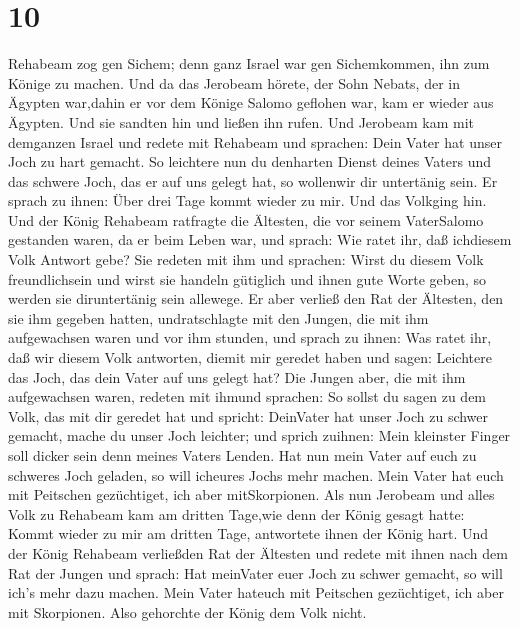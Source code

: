 \hypertarget{section-9}{%
\section{10}\label{section-9}}

 Rehabeam zog gen Sichem; denn ganz Israel war gen
Sichemkommen, ihn zum Könige zu machen.  Und da das Jerobeam
hörete, der Sohn Nebats, der in Ägypten war,dahin er vor dem Könige
Salomo geflohen war, kam er wieder aus Ägypten.  Und sie
sandten hin und ließen ihn rufen. Und Jerobeam kam mit demganzen Israel
und redete mit Rehabeam und sprachen:  Dein Vater hat unser
Joch zu hart gemacht. So leichtere nun du denharten Dienst deines Vaters
und das schwere Joch, das er auf uns gelegt hat, so wollenwir dir
untertänig sein.  Er sprach zu ihnen: Über drei Tage kommt
wieder zu mir. Und das Volkging hin.  Und der König Rehabeam
ratfragte die Ältesten, die vor seinem VaterSalomo gestanden waren, da
er beim Leben war, und sprach: Wie ratet ihr, daß ichdiesem Volk Antwort
gebe?  Sie redeten mit ihm und sprachen: Wirst du diesem
Volk freundlichsein und wirst sie handeln gütiglich und ihnen gute Worte
geben, so werden sie diruntertänig sein allewege.  Er aber
verließ den Rat der Ältesten, den sie ihm gegeben hatten, undratschlagte
mit den Jungen, die mit ihm aufgewachsen waren und vor ihm stunden,
 und sprach zu ihnen: Was ratet ihr, daß wir diesem Volk
antworten, diemit mir geredet haben und sagen: Leichtere das Joch, das
dein Vater auf uns gelegt hat?  Die Jungen aber, die mit
ihm aufgewachsen waren, redeten mit ihmund sprachen: So sollst du sagen
zu dem Volk, das mit dir geredet hat und spricht: DeinVater hat unser
Joch zu schwer gemacht, mache du unser Joch leichter; und sprich
zuihnen: Mein kleinster Finger soll dicker sein denn meines Vaters
Lenden.  Hat nun mein Vater auf euch zu schweres Joch
geladen, so will icheures Jochs mehr machen. Mein Vater hat euch mit
Peitschen gezüchtiget, ich aber mitSkorpionen.  Als nun
Jerobeam und alles Volk zu Rehabeam kam am dritten Tage,wie denn der
König gesagt hatte: Kommt wieder zu mir am dritten Tage, 
antwortete ihnen der König hart. Und der König Rehabeam verließden Rat
der Ältesten  und redete mit ihnen nach dem Rat der Jungen
und sprach: Hat meinVater euer Joch zu schwer gemacht, so will ich's
mehr dazu machen. Mein Vater hateuch mit Peitschen gezüchtiget, ich aber
mit Skorpionen.  Also gehorchte der König dem Volk nicht.
